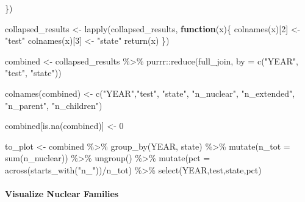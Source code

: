 \documentclass[
]{book}
\newenvironment{Shaded}{\begin{snugshade}}{\end{snugshade}}
\newcommand{\AttributeTok}[1]{\textcolor[rgb]{0.77,0.63,0.00}{#1}}
\newcommand{\ControlFlowTok}[1]{\textcolor[rgb]{0.13,0.29,0.53}{\textbf{#1}}}
\newcommand{\DecValTok}[1]{\textcolor[rgb]{0.00,0.00,0.81}{#1}}
\newcommand{\FunctionTok}[1]{\textcolor[rgb]{0.00,0.00,0.00}{#1}}
\newcommand{\NormalTok}[1]{#1}
\newcommand{\OtherTok}[1]{\textcolor[rgb]{0.56,0.35,0.01}{#1}}
\newcommand{\SpecialCharTok}[1]{\textcolor[rgb]{0.00,0.00,0.00}{#1}}
\newcommand{\StringTok}[1]{\textcolor[rgb]{0.31,0.60,0.02}{#1}}
\begin{document}
\begin{Shaded}
\begin{Highlighting}[]
\NormalTok{\})}


\NormalTok{collapsed\_results }\OtherTok{\textless{}{-}} \FunctionTok{lapply}\NormalTok{(collapsed\_results, }\ControlFlowTok{function}\NormalTok{(x)\{}
  \FunctionTok{colnames}\NormalTok{(x)[}\DecValTok{2}\NormalTok{] }\OtherTok{\textless{}{-}} \StringTok{"test"}
  \FunctionTok{colnames}\NormalTok{(x)[}\DecValTok{3}\NormalTok{] }\OtherTok{\textless{}{-}} \StringTok{"state"}
  \FunctionTok{return}\NormalTok{(x)}
\NormalTok{\})}

\NormalTok{combined }\OtherTok{\textless{}{-}}\NormalTok{ collapsed\_results }\SpecialCharTok{\%\textgreater{}\%}\NormalTok{ purrr}\SpecialCharTok{::}\FunctionTok{reduce}\NormalTok{(full\_join, }\AttributeTok{by =} \FunctionTok{c}\NormalTok{(}\StringTok{"YEAR"}\NormalTok{, }\StringTok{"test"}\NormalTok{, }\StringTok{"state"}\NormalTok{))}



\FunctionTok{colnames}\NormalTok{(combined) }\OtherTok{\textless{}{-}} \FunctionTok{c}\NormalTok{(}\StringTok{"YEAR"}\NormalTok{,}\StringTok{"test"}\NormalTok{, }\StringTok{"state"}\NormalTok{, }\StringTok{"n\_nuclear"}\NormalTok{, }\StringTok{"n\_extended"}\NormalTok{, }\StringTok{"n\_parent"}\NormalTok{, }\StringTok{"n\_children"}\NormalTok{)}

\NormalTok{combined[}\FunctionTok{is.na}\NormalTok{(combined)] }\OtherTok{\textless{}{-}} \DecValTok{0}


\NormalTok{to\_plot }\OtherTok{\textless{}{-}}\NormalTok{ combined }\SpecialCharTok{\%\textgreater{}\%} \FunctionTok{group\_by}\NormalTok{(YEAR, state) }\SpecialCharTok{\%\textgreater{}\%} \FunctionTok{mutate}\NormalTok{(}\AttributeTok{n\_tot =} \FunctionTok{sum}\NormalTok{(n\_nuclear)) }\SpecialCharTok{\%\textgreater{}\%} \FunctionTok{ungroup}\NormalTok{() }\SpecialCharTok{\%\textgreater{}\%} \FunctionTok{mutate}\NormalTok{(}\AttributeTok{pct =}  \FunctionTok{across}\NormalTok{(}\FunctionTok{starts\_with}\NormalTok{(}\StringTok{"n\_"}\NormalTok{))}\SpecialCharTok{/}\NormalTok{n\_tot) }\SpecialCharTok{\%\textgreater{}\%} \FunctionTok{select}\NormalTok{(YEAR,test,state,pct)}
\end{Highlighting}
\end{Shaded}

\hypertarget{visualize-nuclear-families}{%
\paragraph{Visualize Nuclear Families}\label{visualize-nuclear-families}}
\end{document}
